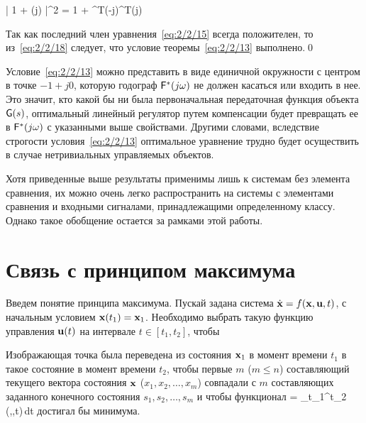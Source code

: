     \bigl| 1 + \funcT(j\omega) \bigr|^2 = 1 + ^T(-j\omega)^T\m{\Lambda}(j\omega) 
\eeq

Так как последний член уравнения~\vref{eq:2/2/15} всегда положителен, то из~\ref{eq:2/2/18} следует, что условие теоремы~\ref{eq:2/2/13} выполнено.\qed

Условие~\ref{eq:2/2/13} можно представить в виде единичной окружности с центром в точке $-1 + j0$, которую годограф $\mathsf{F}^{*}(j\omega)$ не должен касаться или входить в нее. Это значит, кто какой бы ни была первоначальная передаточная функция объекта $\mathsf{G}(s)$, оптимальный линейный регулятор путем компенсации будет превращать ее в $\mathsf{F}^{*}(j\omega)$ с указанными выше свойствами. Другими словами, вследствие строгости условия~\vref{eq:2/2/13} оптимальное уравнение трудно будет осуществить в случае нетривиальных управляемых объектов.

\br

Хотя приведенные выше результаты применимы лишь к системам без элемента сравнения, их можно очень легко распространить на системы с элементами сравнения и входными сигналами, принадлежащими определенному классу. Однако такое обобщение остается за рамками этой работы.



\section{Связь с принципом максимума}




Введем понятие принципа максимума. Пускай задана система $\dot{\mathbf{x}} = f(\mathbf{x}, \mathbf{u}, t)$, с начальным условием $\mathbf{x}(t_1) = \mathbf{x}_1$. Необходимо выбрать такую функцию управления $\mathbf{u}(t)$ на интервале $t \in [t_1, t_2]$, чтобы

\benum
    \item
        Изображающая точка была переведена из состояния $\mathbf{x}_1$ в момент времени $t_1$ в такое состояние в момент времени $t_2$, чтобы первые $m$ ($m \leqslant n$) составляющий текущего вектора состояния $\mathbf{x}$ ($x_1, x_2, \ldots, x_m$) совпадали с $m$ составляющих заданного конечного состояния $s_1, s_2, \ldots, s_m$ и чтобы функционал
            \funcF = \int\limits_{t_1}^{t_2} \funcL(,,t)\,dt
        \eeq
        достигал бы минимума.

